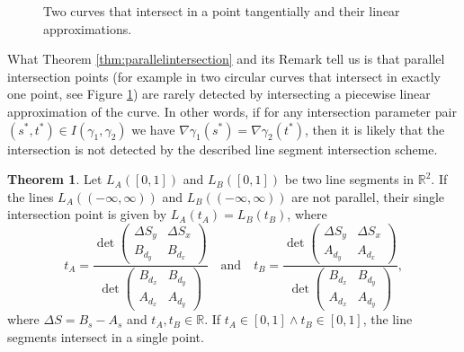 \documentclass[a4paper, 11pt]{report}
\theoremstyle{definition}
\newtheorem{theorem}[definition]{Theorem}
\begin{document}
	\begin{figure}[H]
		\centering
		
		\caption{Two curves that intersect in a point tangentially and their linear approximations.}
		\label{fig:tangentialintersection}
	\end{figure}

	What Theorem \ref{thm:parallelintersection} and its Remark tell us is that parallel intersection points (for example in two circular curves that intersect in exactly one point, see Figure \ref{fig:tangentialintersection}) are rarely detected by intersecting a piecewise linear approximation of the curve. In other words, if for any intersection parameter pair $(s^*, t^*) \in I(\gamma_1, \gamma_2)$ we have $\nabla \gamma_1(s^*) = \nabla \gamma_2(t^*)$, then it is likely that the intersection is not detected by the described line segment intersection scheme.
 	
	\begin{theorem}\label{thm:lineintersection}
		Let $L_A([0,1])$ and $L_B([0,1])$ be two line segments in $\mathbb{R}^2$. If the lines $L_A((-\infty,\infty))$ and $L_B((-\infty,\infty))$ are not parallel, their single intersection point is given by $L_A(t_A) = L_B(t_B)$, where
			\begin{equation*}\label{eq:lineintersection}
				t_A = 
				\frac {
					\det
					\begin{pmatrix}
						\Delta S_y 	& \Delta S_x		\\
						B_{d_y}	& B_{d_x}
					\end{pmatrix}
				}
				{
					\det
					\begin{pmatrix}
						B_{d_x} & B_{d_y} 	\\
						A_{d_x} & A_{d_y}
					\end{pmatrix}
				}
				\quad\text{and}\quad
				t_B =
				\frac {
					\det
					\begin{pmatrix}
						\Delta S_y 	& \Delta S_x		\\
						A_{d_y}	& A_{d_x}
					\end{pmatrix}
				}
				{
					\det
					\begin{pmatrix}
						B_{d_x} & B_{d_y} 	\\
						A_{d_x} & A_{d_y}
					\end{pmatrix}
				},
			\end{equation*}
		where $\Delta S = B_s - A_s$ and $t_A, t_B \in \mathbb{R}$. If $t_A \in [0,1] \wedge t_B \in [0,1]$, the line segments intersect in a single point.
	\end{theorem}
	
\end{document}

